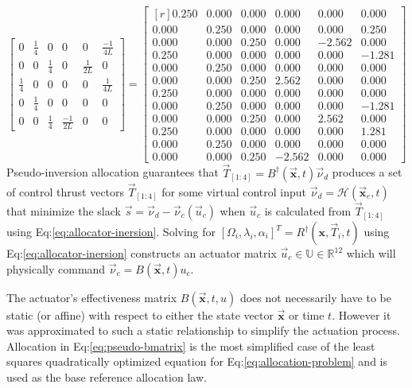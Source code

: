 \begin{subequations}
\begin{equation}
\begin{bmatrix}
0 & \frac{1}{4} & 0 & 0 & 0 & \frac{-1}{4L}\\
0 & 0 & \frac{1}{4} & 0 & \frac{1}{2L} & 0\\
\frac{1}{4} & 0 & 0 & 0 & 0 & \frac{1}{4L}\\
0 & \frac{1}{4} & 0 & 0 & 0 & 0\\
0 & 0 & \frac{1}{4} & \frac{-1}{2L} & 0 & 0
\end{bmatrix}
\end{equation}
\begin{equation}
=\begin{bmatrix*}[r]
0.250 & 0.000 & 0.000 & 0.000 & 0.000 & 0.000\\
0.000 & 0.250 & 0.000 & 0.000 & 0.000 & 0.250\\
0.000 & 0.000 & 0.250 & 0.000 & -2.562 & 0.000\\
0.250 & 0.000 & 0.000 & 0.000 & 0.000 & -1.281\\
0.000 & 0.250 & 0.000 & 0.000 & 0.000 & 0.000\\
0.000 & 0.000 & 0.250 & 2.562 & 0.000 & 0.000\\
0.250 & 0.000 & 0.000 & 0.000 & 0.000 & 0.000\\
0.000 & 0.250 & 0.000 & 0.000 & 0.000 & -1.281\\
0.000 & 0.000 & 0.250 & 0.000 & 2.562 & 0.000\\
0.250 & 0.000 & 0.000 & 0.000 & 0.000 & 1.281\\
0.000 & 0.250 & 0.000 & 0.000 & 0.000 & 0.000\\
0.000 & 0.000 & 0.250 & -2.562 & 0.000 & 0.000
\end{bmatrix*}
\end{equation}
\end{subequations}
Pseudo-inversion allocation guarantees that $\vec{T}_{[1:4]}=B^\dagger(\vec{\mathbf{x}},t)\vec{\nu}_d$ produces a set of control thrust vectors $\vec{T}_{[1:4]}$ for some virtual control input $\vec{\nu}_d=\mathcal{H}(\vec{\mathbf{x}}_e,t)$ that minimize the slack $\vec{s}=\vec{\nu}_d-\vec{\nu}_c(\vec{u}_c)$ when $\vec{u}_c$ is calculated from $\vec{T}_{[1:4]}$ using Eq:\ref{eq:allocator-inersion}. Solving for $[\Omega_i,\lambda_i,\alpha_i]^T=R^\dagger(\mathbf{x},\vec{T}_i,t)$ using Eq:\ref{eq:allocator-inersion} constructs an actuator matrix $\vec{u}_c\in\mathbb{U}\in\mathbb{R}^{12}$ which will physically command $\vec{\nu}_c=B(\vec{\mathbf{x}},t)u_c$. 
\par
The actuator's effectiveness matrix $B(\vec{\mathbf{x}},t,u)$ does not necessarily have to be static (or affine) with respect to either the state vector $\vec{\mathbf{x}}$ or time $t$. However it was approximated to such a static relationship to simplify the actuation process. Allocation in Eq:\ref{eq:pseudo-bmatrix} is the most simplified case of the least squares quadratically optimized equation for Eq:\ref{eq:allocation-problem} and is used as the base reference allocation law.

